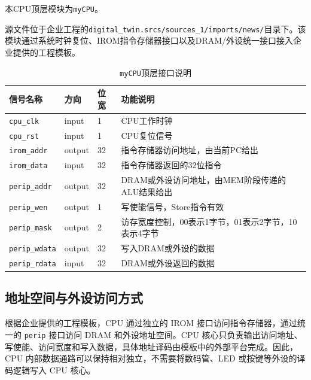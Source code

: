 \documentclass[12pt,a4paper]{ctexart}
\newcommand{\code}[1]{\texttt{#1}}
\begin{document}
本CPU顶层模块为\code{myCPU}。

源文件位于企业工程的\code{digital\_twin.srcs/sources\_1/imports/news/}目录下。该模块通过系统时钟复位、IROM指令存储器接口以及DRAM/外设统一接口接入企业提供的工程模板。

\begin{table}[H]
	\centering
	\caption{\code{myCPU}顶层接口说明}
	\begin{tabularx}{\textwidth}{p{3cm}p{2cm}p{2cm}X}
		\toprule
		信号名称                & 方向     & 位宽 & 功能说明                           \\
		\midrule
		\code{cpu\_clk}     & input  & 1  & CPU工作时钟                        \\
		\code{cpu\_rst}     & input  & 1  & CPU复位信号                        \\
		\code{irom\_addr}   & output & 32 & 指令存储器访问地址，由当前PC给出              \\
		\code{irom\_data}   & input  & 32 & 指令存储器返回的32位指令                  \\
		\code{perip\_addr}  & output & 32 & DRAM或外设访问地址，由MEM阶段传递的ALU结果给出   \\
		\code{perip\_wen}   & output & 1  & 写使能信号，Store指令有效                \\
		\code{perip\_mask}  & output & 2  & 访存宽度控制，00表示1字节，01表示2字节，10表示4字节 \\
		\code{perip\_wdata} & output & 32 & 写入DRAM或外设的数据                   \\
		\code{perip\_rdata} & input  & 32 & DRAM或外设返回的数据                   \\
		\bottomrule
	\end{tabularx}
\end{table}


\subsection{地址空间与外设访问方式}

根据企业提供的工程模板，CPU 通过独立的 IROM 接口访问指令存储器，通过统一的 \code{perip} 接口访问 DRAM 和外设地址空间。CPU 核心只负责输出访问地址、写使能、访问宽度和写入数据，具体地址译码由模板中的外部平台完成。因此，CPU 内部数据通路可以保持相对独立，不需要将数码管、LED 或按键等外设的译码逻辑写入 CPU 核心。
\end{document}
